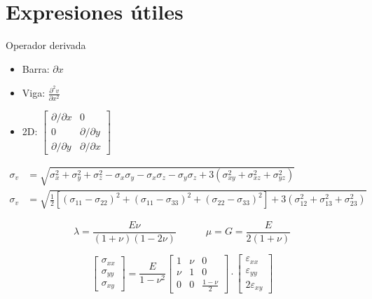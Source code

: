 \documentclass[11pt, a4paper,titlepage]{article}
\newcommand{\dpartial}[2]{\ensuremath{\frac{\partial^2 #1}{\partial #2 ^2}}}
\begin{document}
\section*{Expresiones útiles}
Operador derivada
\begin{itemize}
	\item Barra: $\partial x$
	\item Viga: $\dpartial{v}{x}$
	\item 2D: $\begin{bmatrix}
	\partial/\partial x & 0\\
	0 & \partial/\partial y \\
	\partial/\partial y & \partial/\partial x
	\end{bmatrix}$

\end{itemize}

\begin{align}
\sigma_{v}&=\sqrt{\sigma_{x}^2+\sigma_{y}^2+\sigma_{z}^2 - \sigma_x \sigma_y-\sigma_x\sigma_z -\sigma_y \sigma_z +3(\sigma_{xy}^2+\sigma_{xz}^2 +\sigma_{yz}^2)} \\
\sigma_{v}&=\sqrt{\tfrac{1}{2}\left[  (\sigma_{11}-\sigma_{22})^2+(\sigma_{11}-\sigma_{33})^2+(\sigma_{22}-\sigma_{33})^2\right] +3(\sigma_{12}^2+\sigma_{13}^2 +\sigma_{23}^2)}
\end{align}

\begin{equation}
\lambda = \frac{E \nu}{(1+\nu)(1-2\nu)} \qquad\quad \mu=G=\frac{E}{2(1+\nu)}
\end{equation}

\begin{equation}
\begin{bmatrix}
\sigma_{xx} \\
\sigma_{yy} \\
\sigma_{xy}
\end{bmatrix}
={\frac{E}{1-\nu^2}} 
\begin{bmatrix}
1 & \nu & 0 \\
\nu & 1 &0 \\
0 & 0 & \frac{1-\nu}{2}
\end{bmatrix}
\cdot
\begin{bmatrix}
\varepsilon_{xx} \\
\varepsilon_{yy} \\
2\varepsilon_{xy}
\end{bmatrix}
\end{equation}
\end{document}
